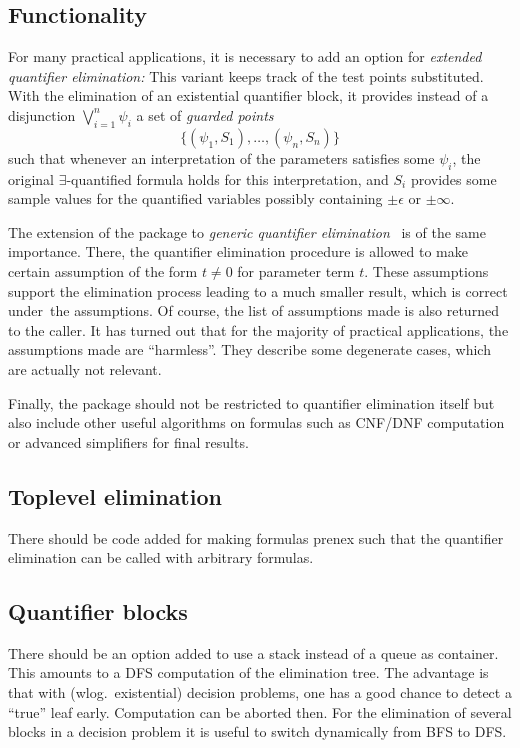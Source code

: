 \subsection{Functionality}
For many practical applications, it is necessary to add an option for
{\em extended quantifier elimination:} This variant keeps track of the
test points substituted. With the elimination of an existential
quantifier block, it provides instead of a disjunction
$\bigvee_{i=1}^n \psi_i$ a set of {\em guarded points}
$$
\bigl\{(\psi_1,S_1),\dots,(\psi_n,S_n)\bigr\}
$$
such that whenever an interpretation of the parameters satisfies some
$\psi_i$, the original $\exists$-quantified formula holds for this
interpretation, and $S_i$ provides some sample values for the
quantified variables possibly containing $\pm\epsilon$ or $\pm\infty$.

The extension of the package to {\em generic quantifier
elimination}~\cite{DSW:96} is of the same importance. There, the
quantifier elimination procedure is allowed to make certain assumption
of the form $t\neq0$ for parameter term $t$. These assumptions support
the elimination process leading to a much smaller result, which is
correct under~the assumptions. Of course, the list of assumptions made
is also returned to the caller. It has turned out that for the
majority of practical applications, the assumptions made are
``harmless''. They describe some degenerate cases, which are actually
not relevant.

Finally, the package should not be restricted to quantifier
elimination itself but also include other useful algorithms on
formulas such as CNF/DNF computation or advanced simplifiers for final
results.
%
\subsection{Toplevel elimination}
There should be code added for making formulas prenex such that the
quantifier elimination can be called with arbitrary formulas.
%
\subsection{Quantifier blocks}\label{blockopt}
There should be an option added to use a stack instead of a queue as
container. This amounts to a DFS computation of the elimination tree.
The advantage is that with (wlog.~existential) decision problems, one
has a good chance to detect a ``true'' leaf early. Computation can be
aborted then. For the elimination of several blocks in a decision
problem it is useful to switch dynamically from BFS to DFS.

